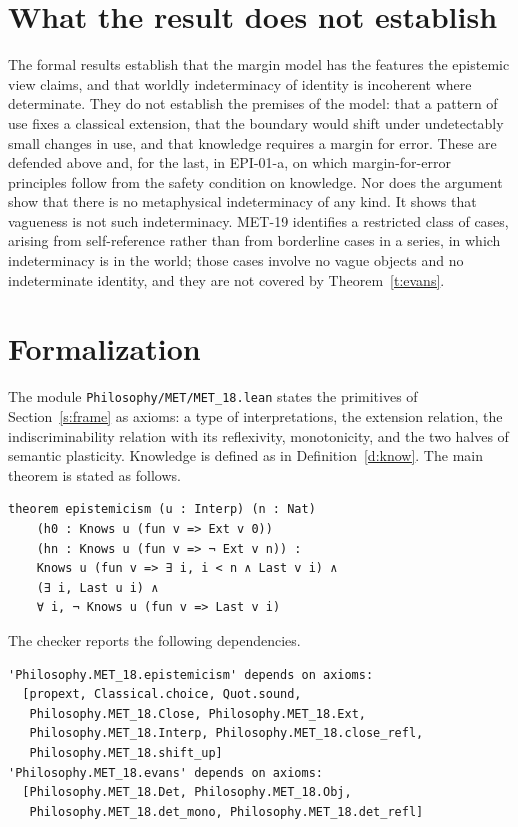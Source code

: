 \documentclass{situationist-preprint}
\begin{document}
\section{What the result does not establish}

The formal results establish that the margin model has the features the epistemic view claims, and that worldly indeterminacy of identity is incoherent where determinate. They do not establish the premises of the model: that a pattern of use fixes a classical extension, that the boundary would shift under undetectably small changes in use, and that knowledge requires a margin for error. These are defended above and, for the last, in EPI-01-a, on which margin-for-error principles follow from the safety condition on knowledge. Nor does the argument show that there is no metaphysical indeterminacy of any kind. It shows that vagueness is not such indeterminacy. MET-19 identifies a restricted class of cases, arising from self-reference rather than from borderline cases in a series, in which indeterminacy is in the world; those cases involve no vague objects and no indeterminate identity, and they are not covered by Theorem~\ref{t:evans}.

\section{Formalization}\label{s:lean}

The module \nolinkurl{Philosophy/MET/MET_18.lean} states the primitives of Section~\ref{s:frame} as axioms: a type of interpretations, the extension relation, the indiscriminability relation with its reflexivity, monotonicity, and the two halves of semantic plasticity. Knowledge is defined as in Definition~\ref{d:know}. The main theorem is stated as follows.

\begin{lstlisting}
theorem epistemicism (u : Interp) (n : Nat)
    (h0 : Knows u (fun v => Ext v 0))
    (hn : Knows u (fun v => ¬ Ext v n)) :
    Knows u (fun v => ∃ i, i < n ∧ Last v i) ∧
    (∃ i, Last u i) ∧
    ∀ i, ¬ Knows u (fun v => Last v i)
\end{lstlisting}

\noindent The checker reports the following dependencies.

\begin{lstlisting}
'Philosophy.MET_18.epistemicism' depends on axioms:
  [propext, Classical.choice, Quot.sound,
   Philosophy.MET_18.Close, Philosophy.MET_18.Ext,
   Philosophy.MET_18.Interp, Philosophy.MET_18.close_refl,
   Philosophy.MET_18.shift_up]
'Philosophy.MET_18.evans' depends on axioms:
  [Philosophy.MET_18.Det, Philosophy.MET_18.Obj,
   Philosophy.MET_18.det_mono, Philosophy.MET_18.det_refl]
\end{lstlisting}
\end{document}
